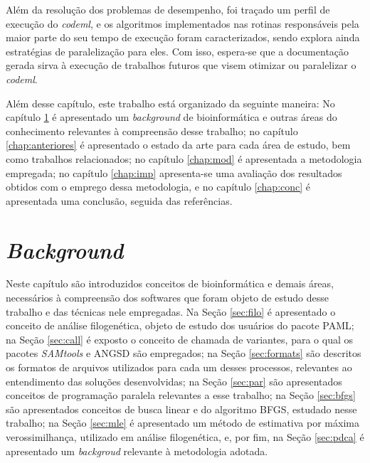 \documentclass[cic,tc]{iiufrgs}
\begin{document}
Além da resolução dos problemas de desempenho, foi traçado um perfil de
execução do \textit{codeml}, e os algoritmos implementados nas rotinas
responsáveis pela maior parte do seu tempo de execução foram caracterizados,
sendo explora ainda estratégias de paralelização para eles. Com isso, espera-se
que a documentação gerada sirva à execução de trabalhos futuros que visem
otimizar ou paralelizar o \textit{codeml}.

%
%
Além desse capítulo, este trabalho está organizado da seguinte maneira: No
capítulo \ref{chap:bg} é apresentado um \textit{background} de bioinformática e
outras áreas do conhecimento relevantes à compreensão desse trabalho; no
capítulo \ref{chap:anteriores} é apresentado o estado da arte para cada área de
estudo, bem como trabalhos relacionados; no capítulo \ref{chap:mod} é
apresentada a metodologia empregada; no capítulo \ref{chap:imp} apresenta-se
uma avaliação dos resultados obtidos com o emprego dessa metodologia, e no
capítulo \ref{chap:conc} é apresentada uma conclusão, seguida das referências.

%
%
%
%

\chapter{\textit{Background}}
\label{chap:bg}

Neste capítulo são introduzidos conceitos de bioinformática e demais áreas,
necessários à compreensão dos softwares que foram objeto de estudo desse
trabalho e das técnicas nele empregadas. Na Seção \ref{sec:filo} é apresentado o
conceito de análise filogenética, objeto de estudo dos usuários do pacote PAML;
na Seção \ref{sec:call} é exposto o conceito de chamada de variantes, para o qual
os pacotes \textit{SAMtools} e ANGSD são empregados; na Seção \ref{sec:formats} são
descritos os formatos de arquivos utilizados para cada um desses processos,
relevantes ao entendimento das soluções desenvolvidas; na Seção \ref{sec:par}
são apresentados conceitos de programação paralela relevantes
a esse trabalho; na Seção \ref{sec:bfgs} são apresentados conceitos de busca
linear e do algoritmo BFGS, estudado nesse trabalho; na Seção \ref{sec:mle} é
apresentado um método de estimativa por máxima verossimilhança, utilizado em
análise filogenética, e, por fim, na Seção \ref{sec:pdca} é apresentado um
\textit{backgroud} relevante à metodologia adotada.

\end{document}
